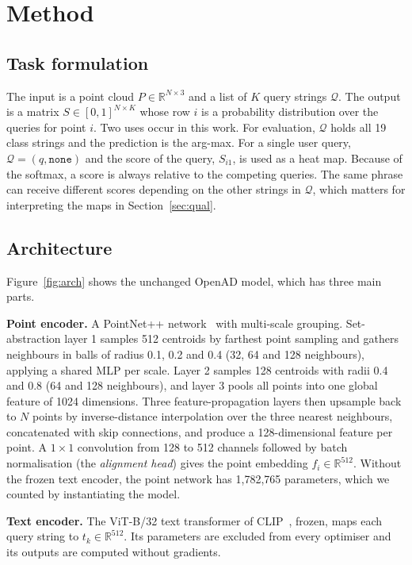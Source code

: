 \documentclass[conference]{IEEEtran}
\begin{document}
\section{Method}
\label{sec:method}

\subsection{Task formulation}
The input is a point cloud $P\in\mathbb{R}^{N\times 3}$ and a list of $K$ query strings $\mathcal{Q}$. The output is a matrix $S\in[0,1]^{N\times K}$ whose row $i$ is a probability distribution over the queries for point $i$. Two uses occur in this work. For evaluation, $\mathcal{Q}$ holds all 19 class strings and the prediction is the arg-max. For a single user query, $\mathcal{Q}=(q,\texttt{none})$ and the score of the query, $S_{i1}$, is used as a heat map. Because of the softmax, a score is always relative to the competing queries. The same phrase can receive different scores depending on the other strings in $\mathcal{Q}$, which matters for interpreting the maps in Section~\ref{sec:qual}.

\subsection{Architecture}
Figure~\ref{fig:arch} shows the unchanged OpenAD model, which has three main parts.

\textbf{Point encoder.} A PointNet++ network~\cite{pointnet2} with multi-scale grouping. Set-abstraction layer 1 samples 512 centroids by farthest point sampling and gathers neighbours in balls of radius 0.1, 0.2 and 0.4 (32, 64 and 128 neighbours), applying a shared MLP per scale. Layer 2 samples 128 centroids with radii 0.4 and 0.8 (64 and 128 neighbours), and layer 3 pools all points into one global feature of 1024 dimensions. Three feature-propagation layers then upsample back to $N$ points by inverse-distance interpolation over the three nearest neighbours, concatenated with skip connections, and produce a 128-dimensional feature per point. A $1\times1$ convolution from 128 to 512 channels followed by batch normalisation (the \emph{alignment head}) gives the point embedding $f_i\in\mathbb{R}^{512}$. Without the frozen text encoder, the point network has 1,782,765 parameters, which we counted by instantiating the model.

\textbf{Text encoder.} The ViT-B/32 text transformer of CLIP~\cite{clip}, frozen, maps each query string to $t_k\in\mathbb{R}^{512}$. Its parameters are excluded from every optimiser and its outputs are computed without gradients.
\end{document}

